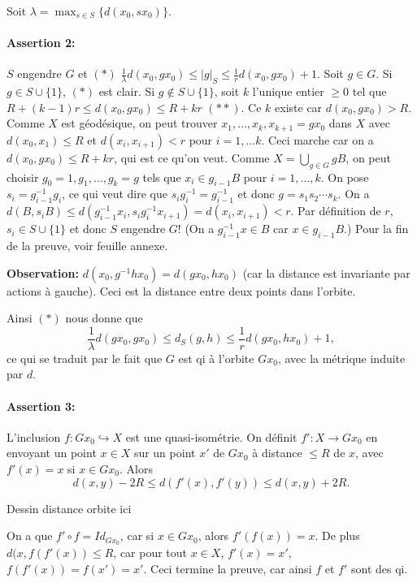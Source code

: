 \begin{preuve}
    Soit $\lambda = \max_{s \in S}\{d(x_0, sx_0)\}$.

    \paragraph{Assertion 2:} $S$ engendre $G$ et $(\ast)$ $\frac{1}{\lambda} d(x_0, gx_0) \leq |g|_S \leq
    \frac{1}{r}d(x_0, gx_0) + 1$. Soit $g \in G$. Si $g \in S \cup \{1\}$, $(\ast)$ est clair. Si $g \notin S
    \cup \{1\}$, soit $k$ l'unique entier $\geq 0$ tel que $R + (k-1)r \leq d(x_0, gx_0) \leq R + kr$
    $(\ast\ast)$. Ce $k$ existe car $d(x_0, gx_0) > R$. Comme $X$ est géodésique, on peut trouver $x_1,
    \ldots, x_k, x_{k+1} = gx_0$ dans $X$ avec $d(x_0, x_1) \leq R$ et $d(x_i, x_{i+1}) < r$ pour $i = 1,
    \ldots k$. Ceci marche car on a $d(x_0, gx_0) \leq R + kr$, qui est ce qu'on veut. Comme $X = \bigcup_{g
      \in G} gB$, on peut choisir $g_0 = 1, g_1, \ldots, g_k = g$ tels que $x_i \in g_{i-1}B$ pour $i = 1,
    \ldots, k$. On pose $s_i = g_{i-1}^{-1}g_i$, ce qui veut dire que $s_ig_i^{-1} = g_{i-1}^{-1}$ et donc $g = s_1s_2\cdots s_k$. On a $d(B, s_iB) \leq
    d(g_{i-1}^{-1}x_i, s_ig_i^{-1}x_{i+1}) = d(x_i, x_{i+1}) < r$. Par définition de $r$, $s_i \in S \cup
    \{1\}$ et donc $S$ engendre $G$! (On a $g_{i-1}^{-1} x \in B$ car $x \in g_{i-1}B$.) Pour la fin de la
    preuve, voir feuille annexe.

    \textbf{Observation:} $d(x_0, g^{-1}hx_0) = d(gx_0, hx_0)$ (car la distance est invariante par actions à
    gauche). Ceci est la distance entre deux points dans l'orbite.

    Ainsi $(\ast)$ nous donne que
      \[\frac{1}{\lambda} d(gx_0, gx_0) \leq d_S(g, h) \leq \frac{1}{r} d(gx_0, hx_0) + 1,\]
    ce qui se traduit par le fait que $G$ est qi à l'orbite $Gx_0$, avec la métrique induite par $d$.

    \paragraph{Assertion 3:} L'inclusion $f: Gx_0 \hookrightarrow X$ est une quasi-isométrie. On définit $f':
    X \to Gx_0$ en envoyant un point $x \in X$ sur un point $x'$ de $Gx_0$ à distance $\leq R$ de $x$, avec
    $f'(x)=x$ si $x \in Gx_0$. Alors
      \[d(x,y) - 2R \leq d(f'(x), f'(y)) \leq d(x,y) + 2R.\]
      \begin{center}
        Dessin distance orbite ici
      \end{center}
    On a que $f' \circ f = Id_{Gx_0}$, car si $x \in Gx_0$, alors $f'(f(x)) = x$. De plus $d(x, f(f'(x)) \leq
    R$, car pour tout $x \in X$, $f'(x) = x'$, $f(f'(x)) = f(x') = x'$. Ceci termine la preuve, car ainsi $f$
    et $f'$ sont des qi.
  \end{preuve}


